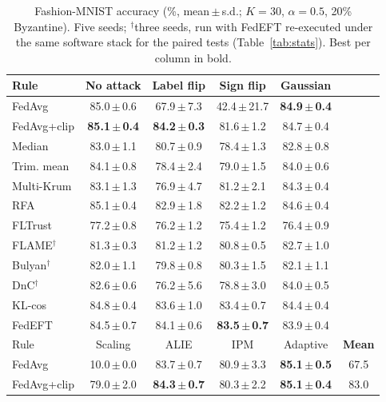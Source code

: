 \begin{table}[!tbp]
\centering
\caption{Fashion-MNIST accuracy (\%, mean\,$\pm$\,s.d.; $K=30$, $\alpha=0.5$, 20\% Byzantine). Five seeds; $^\dagger$three seeds, run with FedEFT re-executed under the same software stack for the paired tests (Table~\ref{tab:stats}). Best per column in bold.}
\label{tab:main_fmnist}
\setlength{\tabcolsep}{3.0pt}
\footnotesize
\begin{tabular}{@{}lccccc@{}}
\toprule
Rule & No attack & Label flip & Sign flip & Gaussian & \\
\midrule
FedAvg & 85.0\,$\pm$\,0.6 & 67.9\,$\pm$\,7.3 & 42.4\,$\pm$\,21.7 & \textbf{84.9\,$\pm$\,0.4} & \\
FedAvg+clip & \textbf{85.1\,$\pm$\,0.4} & \textbf{84.2\,$\pm$\,0.3} & 81.6\,$\pm$\,1.2 & 84.7\,$\pm$\,0.4 & \\
Median & 83.0\,$\pm$\,1.1 & 80.7\,$\pm$\,0.9 & 78.4\,$\pm$\,1.3 & 82.8\,$\pm$\,0.8 & \\
Trim. mean & 84.1\,$\pm$\,0.8 & 78.4\,$\pm$\,2.4 & 79.0\,$\pm$\,1.5 & 84.0\,$\pm$\,0.6 & \\
Multi-Krum & 83.1\,$\pm$\,1.3 & 76.9\,$\pm$\,4.7 & 81.2\,$\pm$\,2.1 & 84.3\,$\pm$\,0.4 & \\
RFA & 85.1\,$\pm$\,0.4 & 82.9\,$\pm$\,1.8 & 82.2\,$\pm$\,1.2 & 84.6\,$\pm$\,0.4 & \\
FLTrust & 77.2\,$\pm$\,0.8 & 76.2\,$\pm$\,1.2 & 75.4\,$\pm$\,1.2 & 76.4\,$\pm$\,0.9 & \\
FLAME$^\dagger$ & 81.3\,$\pm$\,0.3 & 81.2\,$\pm$\,1.2 & 80.8\,$\pm$\,0.5 & 82.7\,$\pm$\,1.0 & \\
Bulyan$^\dagger$ & 82.0\,$\pm$\,1.1 & 79.8\,$\pm$\,0.8 & 80.3\,$\pm$\,1.5 & 82.1\,$\pm$\,1.1 & \\
DnC$^\dagger$ & 82.6\,$\pm$\,0.6 & 76.2\,$\pm$\,5.6 & 78.8\,$\pm$\,3.0 & 84.0\,$\pm$\,0.5 & \\
KL-cos & 84.8\,$\pm$\,0.4 & 83.6\,$\pm$\,1.0 & 83.4\,$\pm$\,0.7 & 84.4\,$\pm$\,0.4 & \\
\midrule
FedEFT & 84.5\,$\pm$\,0.7 & 84.1\,$\pm$\,0.6 & \textbf{83.5\,$\pm$\,0.7} & 83.9\,$\pm$\,0.4 & \\
\midrule
Rule & Scaling & ALIE & IPM & Adaptive & \textbf{Mean}\\
\midrule
FedAvg & 10.0\,$\pm$\,0.0 & 83.7\,$\pm$\,0.7 & 80.9\,$\pm$\,3.3 & \textbf{85.1\,$\pm$\,0.5} & 67.5\\
FedAvg+clip & 79.0\,$\pm$\,2.0 & \textbf{84.3\,$\pm$\,0.7} & 80.3\,$\pm$\,2.2 & \textbf{85.1\,$\pm$\,0.4} & 83.0\\

\end{tabular}
\end{table}
